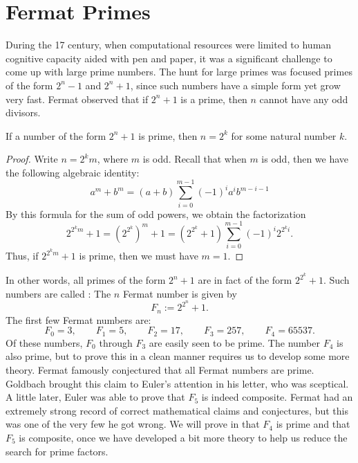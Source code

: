\section{Fermat Primes}

During the 17\supth{} century, when computational resources were limited to human cognitive capacity aided with pen and paper, it was a significant challenge to come up with large prime numbers. The hunt for large primes was focused primes of the form $2^n-1$ and $2^n+1$, since such numbers have a simple form yet grow very fast. Fermat observed that if $2^n+1$ is a prime, then $n$ cannot have any odd divisors.

\begin{theorem}
  If a number of the form $2^n+1$ is prime, then $n=2^k$ for some natural number $k$.
\end{theorem}

\begin{proof}
  Write $n=2^km$, where $m$ is odd. Recall that when $m$ is odd, then we have the following algebraic identity:
  \begin{equation*}
    a^m+b^m=(a+b)\sum_{i=0}^{m-1}(-1)^ia^ib^{m-i-1}
  \end{equation*}
  By this formula for the sum of odd powers, we obtain the factorization
  \begin{equation*}
    2^{2^km}+1=(2^{2^k})^m+1=(2^{2^k}+1)\sum_{i=0}^{m-1} (-1)^i2^{2^k i}.
  \end{equation*}
  Thus, if $2^{2^km}+1$ is prime, then we must have $m=1$.
\end{proof}

In other words, all primes of the form $2^n+1$ are in fact of the form $2^{2^{k}}+1$. Such numbers are called : The $n$\supth{} Fermat number is given by
\begin{equation*}
  F_n:=2^{2^n}+1.
\end{equation*}
The first few Fermat numbers are:
\begin{equation*}
  F_0=3,\qquad F_1=5,\qquad F_2=17,\qquad F_3=257,\qquad F_4=65537.
\end{equation*}
Of these numbers, $F_0$ through $F_3$ are easily seen to be prime. The number $F_4$ is also prime, but to prove this in a clean manner requires us to develop some more theory. Fermat famously conjectured that all Fermat numbers are prime. Goldbach brought this claim to Euler's attention in his letter, who was sceptical. A little later, Euler was able to prove that $F_5$ is indeed composite. Fermat had an extremely strong record of correct mathematical claims and conjectures, but this was one of the very few he got wrong. We will prove in  that $F_4$ is prime and that $F_5$ is composite, once we have developed a bit more theory to help us reduce the search for prime factors.

